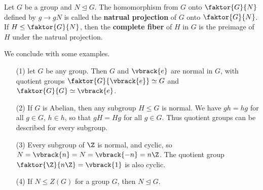 \begin{definition}
    Let $G$ be a group and  $N \unlhd G$. The homomorphism from $G$ onto
    $\faktor{G}{N}$ defined by $g \rightarrow gN$ is called the \textbf{natrual
    projection} of $G$ onto  $\faktor{G}{N}$. If $H \leq \faktor{G}{N}$, then
    the \textbf{complete fiber} of $H$ in  $G$ is the preimage of $H$ under the
    natrual projection.
\end{definition}

We conclude with some examples.

\begin{example}\label{3.4}
    \begin{enumerate}
        \item[(1)] let $G$ be any group. Then $G$ and $\vbrack{e}$ are normal
            in $G$, with quotient groups $\faktor{G}{\vbrack{e}} \simeq G$ and
            $\faktor{G}{G} \simeq \vbrack{e}$.

        \item[(2)] If $G$ is Abelian, then any subgroup  $H \leq G$ is normal.
            We have  $gh=hg$ for all  $g \in G$,  $h \in h$, so that  $gH=Hg$
            for all  $g \in G$. Thus quotient groups can be described for every
            subgroup.

        \item [(3)] Every subgroup of $\Z$ is normal, and cyclic, so
            $N=\vbrack{n}=N=\vbrack{-n}=n\Z$. The quotient group
            $\faktor{\Z}{n\Z}=\vbrack{1}$ is also cyclic.

        \item[(4)] If $N \leq Z(G)$ for a group $G$, then  $N \unlhd G$.
    \end{enumerate}
\end{example}
